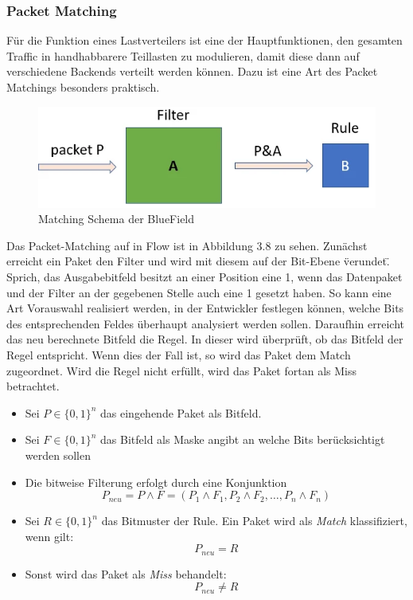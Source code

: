 \subsubsection{Packet Matching}
Für die Funktion eines Lastverteilers ist eine der Hauptfunktionen, den gesamten Traffic in handhabbarere Teillasten zu modulieren, damit diese dann auf verschiedene Backends verteilt werden können. Dazu ist eine Art des Packet Matchings besonders praktisch. 
\begin{figure}
    \centering
    \includegraphics[width=1\linewidth]{images/paketmatchng.png}
    \caption{Matching Schema der BlueField}
    \label{fig:enter-label}
\end{figure}
Das Packet-Matching auf in Flow ist in Abbildung 3.8 zu sehen. Zunächst erreicht ein Paket den Filter und wird mit diesem auf der Bit-Ebene \"verundet\". Sprich, das Ausgabebitfeld besitzt an einer Position eine 1, wenn das Datenpaket und der Filter an der gegebenen Stelle auch eine 1 gesetzt haben. So kann eine Art Vorauswahl realisiert werden, in der Entwickler festlegen können, welche Bits des entsprechenden Feldes überhaupt analysiert werden sollen. Daraufhin erreicht das neu berechnete Bitfeld die Regel. In dieser wird überprüft, ob das Bitfeld der Regel entspricht. Wenn dies der Fall ist, so wird das Paket dem Match zugeordnet. Wird die Regel nicht erfüllt, wird das Paket fortan als Miss betrachtet.
\begin{itemize}
  \item Sei $P \in \{0,1\}^n$ das eingehende Paket als Bitfeld.
  \item Sei $F \in \{0,1\}^n$ das Bitfeld als Maske angibt an welche Bits berücksichtigt werden sollen
  \item Die bitweise Filterung erfolgt durch eine Konjunktion  
  \[
    P_{neu} = P \land F = (P_1 \land F_1, P_2 \land F_2, \dots, P_n \land F_n)
  \]
  \item Sei $R \in \{0,1\}^n$ das Bitmuster der Rule. Ein Paket wird als \emph{Match} klassifiziert, wenn gilt:
  \[
    P_{neu} = R
  \]
  \item Sonst wird das Paket als \emph{Miss} behandelt:
  \[
    P_{neu} \ne R
  \]
\end{itemize}

